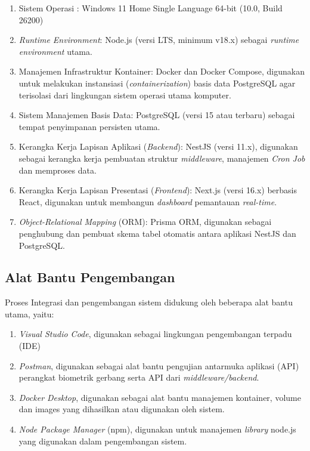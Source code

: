 \begin{enumerate}
    \item Sistem Operasi : Windows 11 Home Single Language 64-bit (10.0, Build 26200)
    \item \textit{Runtime Environment}: Node.js (versi LTS, minimum v18.x) sebagai \textit{runtime environment} utama.
    \item Manajemen Infrastruktur Kontainer: Docker dan Docker Compose, digunakan untuk melakukan instansiasi (\textit{containerization}) basis data PostgreSQL agar terisolasi dari lingkungan sistem operasi utama komputer.
    \item Sistem Manajemen Basis Data: PostgreSQL (versi 15 atau terbaru) sebagai tempat penyimpanan persisten utama.
    \item Kerangka Kerja Lapisan Aplikasi (\textit{Backend}): NestJS (versi 11.x), digunakan sebagai kerangka kerja pembuatan struktur \textit{middleware}, manajemen \textit{Cron Job} dan memproses data.
    \item Kerangka Kerja Lapisan Presentasi (\textit{Frontend}): Next.js (versi 16.x) berbasis React, digunakan untuk membangun \textit{dashboard} pemantauan \textit{real-time}.
    \item \textit{Object-Relational Mapping} (ORM): Prisma ORM, digunakan sebagai penghubung dan pembuat skema tabel otomatis antara aplikasi NestJS dan PostgreSQL.
\end{enumerate}

\subsection{Alat Bantu Pengembangan}
Proses Integrasi dan pengembangan sistem didukung oleh beberapa alat bantu utama, yaitu:

\begin{enumerate}
    \item \textit{Visual Studio Code}, digunakan sebagai lingkungan pengembangan terpadu (IDE)
    \item \textit{Postman}, digunakan sebagai alat bantu pengujian antarmuka aplikasi (API) perangkat biometrik gerbang serta API dari \textit{middleware/backend}.
    \item \textit{Docker Desktop}, digunakan sebagai alat bantu manajemen kontainer, volume dan images yang dihasilkan atau digunakan oleh sistem.
    \item \textit{Node Package Manager} (npm), digunakan untuk manajemen \textit{library} node.js yang digunakan dalam pengembangan sistem.
\end{enumerate}

